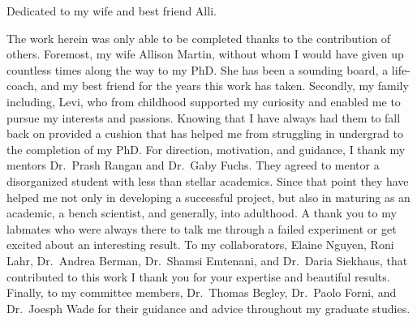 \documentclass[12pt,oneside]{reedthesis}
\begin{document}
  \begin{dedication}
  \pagestyle{plain}
    Dedicated to my wife and best friend Alli.
  \end{dedication}
  \begin{acknowledgements}
  \pagestyle{plain}
    The work herein was only able to be completed thanks to the contribution of others. Foremost, my wife Allison Martin, without whom I would have given up countless times along the way to my PhD. She has been a sounding board, a life-coach, and my best friend for the years this work has taken.
    Secondly, my family including, Levi, who from childhood supported my curiosity and enabled me to pursue my interests and passions. Knowing that I have always had them to fall back on provided a cushion that has helped me from struggling in undergrad to the completion of my PhD.
    For direction, motivation, and guidance, I thank my mentors Dr.~Prash Rangan and Dr.~Gaby Fuchs. They agreed to mentor a disorganized student with less than stellar academics. Since that point they have helped me not only in developing a successful project, but also in maturing as an academic, a bench scientist, and generally, into adulthood.
    A thank you to my labmates who were always there to talk me through a failed experiment or get excited about an interesting result.
    To my collaborators, Elaine Nguyen, Roni Lahr, Dr.~Andrea Berman, Dr.~Shamsi Emtenani, and Dr.~Daria Siekhaus, that contributed to this work I thank you for your expertise and beautiful results.
    Finally, to my committee members, Dr.~Thomas Begley, Dr.~Paolo Forni, and Dr.~Joesph Wade for their guidance and advice throughout my graduate studies.
  \end{acknowledgements}
\end{document}
